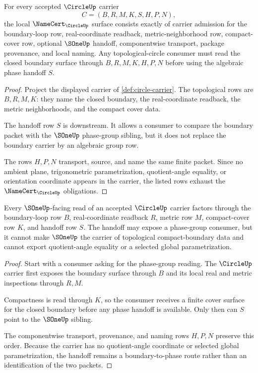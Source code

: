 \begin{theorem}
\label{thm:circle-namecert-obligations}
For every accepted $\CircleUp$ carrier
$$
C=(B,R,M,K,S,H,P,N),
$$
the local $\NameCert_{\CircleUp}$ surface consists exactly of carrier admission for the boundary-loop row, real-coordinate readback, metric-neighborhood row, compact-cover row, optional $\SOneUp$ handoff, componentwise transport, package provenance, and local naming. Any topological-circle consumer must read the closed boundary surface through $B,R,M,K,H,P,N$ before using the algebraic phase handoff $S$.
\end{theorem}
\begin{proof}
Project the displayed carrier of \autoref{def:circle-carrier}. The topological rows are $B,R,M,K$: they name the closed boundary, the real-coordinate readback, the metric neighborhoods, and the compact cover data.

The handoff row $S$ is downstream. It allows a consumer to compare the boundary packet with the $\SOneUp$ phase-group sibling, but it does not replace the boundary carrier by an algebraic group row.

The rows $H,P,N$ transport, source, and name the same finite packet. Since no ambient plane, trigonometric parametrization, quotient-angle equality, or orientation coordinate appears in the carrier, the listed rows exhaust the $\NameCert_{\CircleUp}$ obligations.
\end{proof}

\begin{theorem}
\label{thm:circle-sone-boundary-handoff}
Every $\SOneUp$-facing read of an accepted $\CircleUp$ carrier factors through the boundary-loop row $B$, real-coordinate readback $R$, metric row $M$, compact-cover row $K$, and handoff row $S$. The handoff may expose a phase-group consumer, but it cannot make $\SOneUp$ the carrier of topological compact-boundary data and cannot export quotient-angle equality or a selected global parametrization.
\end{theorem}
\begin{proof}
Start with a consumer asking for the phase-group reading. The $\CircleUp$ carrier first exposes the boundary surface through $B$ and its local real and metric inspections through $R,M$.

Compactness is read through $K$, so the consumer receives a finite cover surface for the closed boundary before any phase handoff is available. Only then can $S$ point to the $\SOneUp$ sibling.

The componentwise transport, provenance, and naming rows $H,P,N$ preserve this order. Because the carrier has no quotient-angle coordinate or selected global parametrization, the handoff remains a boundary-to-phase route rather than an identification of the two packets.
\end{proof}

